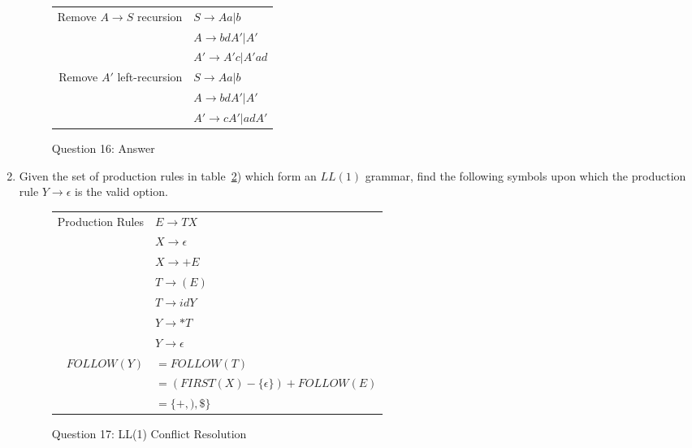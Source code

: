 \documentclass[10pt, oneside, letterpaper]{article}
\begin{document}
\begin{enumerate}
\begin{figure}[!htb]
	\caption{Question 16: Answer}
	\label{tab:q16-answer}
	\begin{center}
		\begin{tabular}{ r | l }
			Remove $A \rightarrow S$ recursion
			& $S \rightarrow Aa|b$ \\
			& $A \rightarrow bd A' | A'$ \\
			& $A' \rightarrow A'c | A' ad$ \\
			\hline
			Remove $A'$ left-recursion
			& $S \rightarrow Aa|b$ \\
			& $A \rightarrow bd A' | A'$ \\
			& $A' \rightarrow cA' | adA'$
		\end{tabular}
	\end{center}
\end{figure}

		\clearpage
		
		\item Given the set of production rules in table~\ref{tab:q-ll1-conflict-resolution}) which form an $LL(1)$ grammar, find the following symbols upon which the production rule $Y \rightarrow \epsilon$ is the valid option.

\begin{figure}[!htb]
	\caption{Question 17: LL(1) Conflict Resolution}
	\label{tab:q-ll1-conflict-resolution}
	\begin{center}
		\begin{tabular}{ r l }
			Production Rules
			& $E \rightarrow TX$ \\
			& $X \rightarrow \epsilon$ \\
			& $X \rightarrow +E$ \\
			& $T \rightarrow (E)$ \\
			& $T \rightarrow id Y$ \\
			& $Y \rightarrow *T$ \\
			& $Y \rightarrow \epsilon $ \\
			\hline
			$FOLLOW(Y)$
			& $= FOLLOW(T)$ \\
			& $= ( FIRST(X) - \{\epsilon\} ) + FOLLOW(E)$ \\
			& $= \{ +, ), \$ \}$
		\end{tabular}
	\end{center}
\end{figure}
		
	\end{enumerate}
		
	\vspace{2cm}
\end{document}
